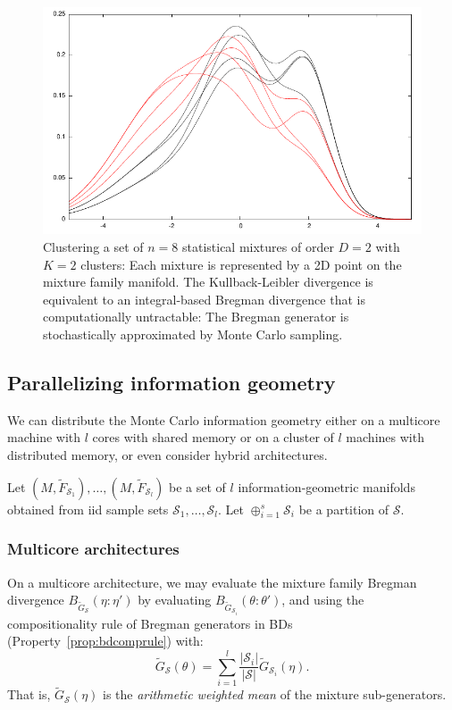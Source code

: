 \documentclass[graybox]{svmult}
\def\tildeF{\tilde{F}}
\def\tildeG{\tilde{G}}
\def\calS{\mathcal{S}}
\begin{document}
\begin{figure}%
\centering
 
\includegraphics[width=0.85\columnwidth]{wgmm-clustering.pdf}%

\caption{Clustering a set of $n=8$ statistical mixtures of order $D=2$ with $K=2$ clusters: 
Each mixture is represented by a 2D point on the mixture family manifold.
The Kullback-Leibler divergence is equivalent to an integral-based Bregman divergence that is computationally untractable: The Bregman generator is stochastically approximated by Monte Carlo sampling.}%
\label{fig:clusteringgmm}%
\end{figure}

\subsection{Parallelizing information geometry}\label{sec:parallel} 
We can distribute the Monte Carlo information geometry either on a multicore machine with $l$ cores with shared memory or on a cluster of $l$ machines with distributed memory, or even consider hybrid architectures. 
 

Let $(M,\tildeF_{\calS_1}), \ldots, (M,\tildeF_{\calS_l})$ be a set of $l$ information-geometric manifolds obtained from iid sample sets $\calS_1,\ldots,\calS_l$. 
Let $\oplus_{i=1}^s \calS_i$ be a partition of $\calS$.


\subsubsection{Multicore architectures}

On a multicore architecture, we may evaluate the mixture family Bregman divergence $B_{\tildeG_\calS}(\eta:\eta')$ by evaluating 
$B_{\tildeG_{\calS_i}}(\theta:\theta')$, and using the compositionality rule of Bregman generators in BDs   (Property~\ref{prop:bdcomprule}) with:
\begin{equation}\label{eq:distmc}
\tildeG_{\calS}(\theta)= \sum_{i=1}^l \frac{|\calS_i|}{|\calS|} \tildeG_{\calS_i}(\eta).
\end{equation}
That is, $\tildeG_{\calS}(\eta)$ is the {\em arithmetic weighted mean} of the mixture sub-generators.
\end{document}
